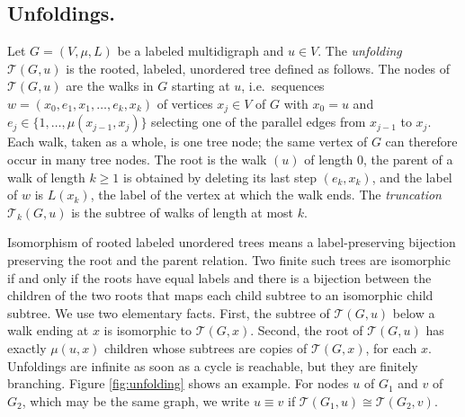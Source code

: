 \documentclass[twoside,leqno]{article}
\newcommand{\Unf}{\mathcal{T}}
\newcommand{\iso}{\cong}
\begin{document}
\subsection{Unfoldings.}
\begin{defn}[Unfolding]
Let $G=(V,\mu,L)$ be a labeled multidigraph and $u\in V$. The \emph{unfolding} $\Unf(G,u)$ is the rooted, labeled, unordered tree defined as follows. The nodes of $\Unf(G,u)$ are the walks in $G$ starting at $u$, i.e.\ sequences $w = (x_0, e_1, x_1, \dots, e_k, x_k)$ of vertices $x_j \in V$ of $G$ with $x_0 = u$ and $e_j \in \{1,\dots,\mu(x_{j-1},x_j)\}$ selecting one of the parallel edges from $x_{j-1}$ to $x_j$. Each walk, taken as a whole, is one tree node; the same vertex of $G$ can therefore occur in many tree nodes. The root is the walk $(u)$ of length $0$, the parent of a walk of length $k\ge 1$ is obtained by deleting its last step $(e_k, x_k)$, and the label of $w$ is $L(x_k)$, the label of the vertex at which the walk ends. The \emph{truncation} $\Unf_k(G,u)$ is the subtree of walks of length at most $k$.
\end{defn}

Isomorphism of rooted labeled unordered trees means a label-preserving bijection preserving the root and the parent relation. Two finite such trees are isomorphic if and only if the roots have equal labels and there is a bijection between the children of the two roots that maps each child subtree to an isomorphic child subtree. We use two elementary facts. First, the subtree of $\Unf(G,u)$ below a walk ending at $x$ is isomorphic to $\Unf(G,x)$. Second, the root of $\Unf(G,u)$ has exactly $\mu(u,x)$ children whose subtrees are copies of $\Unf(G,x)$, for each $x$. Unfoldings are infinite as soon as a cycle is reachable, but they are finitely branching. Figure \ref{fig:unfolding} shows an example. For nodes $u$ of $G_1$ and $v$ of $G_2$, which may be the same graph, we write $u\equiv v$ if $\Unf(G_1,u)\iso\Unf(G_2,v)$.
\end{document}
